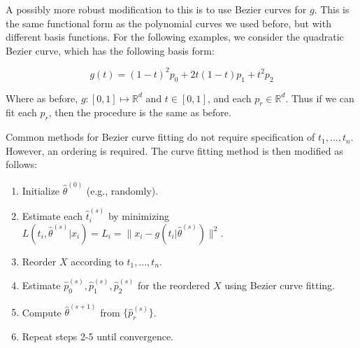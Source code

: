 \documentclass[
  11pt,
]{article}
\providecommand{\tightlist}{%
  \setlength{\itemsep}{0pt}\setlength{\parskip}{0pt}}
\begin{document}
A possibly more robust modification to this is to use Bezier curves for
\(g\). This is the same functional form as the polynomial curves we used
before, but with different basis functions. For the following examples,
we consider the quadratic Bezier curve, which has the following basis
form:

\[
g(t) = (1 - t)^2 p_0 + 2 t (1 - t) p_1 + t^2 p_2
\]

Where as before, \(g : [0, 1] \mapsto \mathbb{R}^d\) and
\(t \in [0, 1]\), and each \(p_r \in \mathbb{R}^d\). Thus if we can fit
each \(p_r\), then the procedure is the same as before.

Common methods for Bezier curve fitting do not require specification of
\(t_1, ..., t_n\). However, an ordering is required. The curve fitting
method is then modified as follows:

\begin{enumerate}
\def\labelenumi{\arabic{enumi}.}
\tightlist
\item
  Initialize \(\hat{\theta}^{(0)}\) (e.g., randomly).
\item
  Estimate each \(\hat{t}_i^{(s)}\) by minimizing
  \(L(t_i, \hat{\theta}^{(s)} | x_i) = L_i = \|x_i - g(t_i | \hat{\theta}^{(s)})\|^2\).
\item
  Reorder \(X\) according to \(t_1, ..., t_n\).
\item
  Estimate \(\hat{p}_0^{(s)}, \hat{p}_1^{(s)}, \hat{p}_2^{(s)}\) for the
  reordered \(X\) using Bezier curve fitting.
\item
  Compute \(\hat{\theta}^{(s+1)}\) from \(\{\hat{p}_r^{(s)}\}\).
\item
  Repeat steps 2-5 until convergence.
\end{enumerate}
\end{document}
